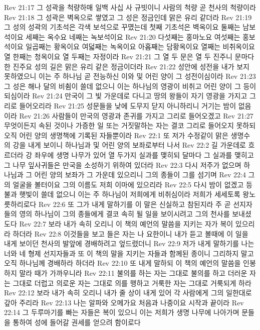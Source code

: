 Rev 21:17  그 성곽을 척량하매 일백 사십 사 규빗이니 사람의 척량 곧 천사의 척량이라
Rev 21:18  그 성곽은 벽옥으로 쌓였고 그 성은 정금인데 맑은 유리 같더라
Rev 21:19  그 성의 성곽의 기초석은 각색 보석으로 꾸몄는데 첫째 기초석은 벽옥이요 둘째는 남보석이요 세째는 옥수요 네째는 녹보석이요
Rev 21:20  다섯째는 홍마노요 여섯째는 홍보석이요 일곱째는 황옥이요 여덟째는 녹옥이요 아홉째는 담황옥이요 열째는 비취옥이요 열 한째는 청옥이요 열 두째는 자정이라
Rev 21:21  그 열 두 문은 열 두 진주니 문마다 한 진주요 성의 길은 맑은 유리 같은 정금이더라
Rev 21:22  성안에 성전을 내가 보지 못하였으니 이는 주 하나님 곧 전능하신 이와 및 어린 양이 그 성전이심이라
Rev 21:23  그 성은 해나 달의 비췸이 쓸데 없으니 이는 하나님의 영광이 비취고 어린 양이 그 등이 되심이라
Rev 21:24  만국이 그 빛 가운데로 다니고 땅의 왕들이 자기 영광을 가지고 그리로 들어오리라
Rev 21:25  성문들을 낮에 도무지 닫지 아니하리니 거기는 밤이 없음이라
Rev 21:26  사람들이 만국의 영광과 존귀를 가지고 그리로 들어오겠고
Rev 21:27  무엇이든지 속된 것이나 가증한 일 또는 거짓말하는 자는 결코 그리로 들어오지 못하되 오직 어린 양의 생명책에 기록된 자들뿐이라
Rev 22:1  또 저가 수정같이 맑은 생명수의 강을 내게 보이니 하나님과 및 어린 양의 보좌로부터 나서
Rev 22:2  길 가운데로 흐르더라 강 좌우에 생명 나무가 있어 열 두가지 실과를 맺히되 달마다 그 실과를 맺히고 그 나무 잎사귀들은 만국을 소성하기 위하여 있더라
Rev 22:3  다시 저주가 없으며 하나님과 그 어린 양의 보좌가 그 가운데 있으리니 그의 종들이 그를 섬기며
Rev 22:4  그의 얼굴을 볼터이요 그의 이름도 저희 이마에 있으리라
Rev 22:5  다시 밤이 없겠고 등불과 햇빛이 쓸데 없으니 이는 주 하나님이 저희에게 비취심이라 저희가 세세토록 왕노릇하리로다
Rev 22:6  또 그가 내게 말하기를 이 말은 신실하고 참된지라 주 곧 선지자들의 영의 하나님이 그의 종들에게 결코 속히 될 일을 보이시려고 그의 천사를 보내셨도다
Rev 22:7  보라 내가 속히 오리니 이 책의 예언의 말씀을 지키는 자가 복이 있으리라 하더라
Rev 22:8  이것들을 보고 들은 자는 나 요한이니 내가 듣고 볼때에 이 일을 내게 보이던 천사의 발앞에 경배하려고 엎드렸더니
Rev 22:9  저가 내게 말하기를 나는 너와 네 형제 선지자들과 또 이 책의 말을 지키는 자들과 함께된 종이니 그리하지 말고 오직 하나님께 경배하라 하더라
Rev 22:10  또 내게 말하되 이 책의 예언의 말씀을 인봉하지 말라 때가 가까우니라
Rev 22:11  불의를 하는 자는 그대로 불의를 하고 더러운 자는 그대로 더럽고 의로운 자는 그대로 의를 행하고 거룩한 자는 그대로 거룩되게 하라
Rev 22:12  보라 내가 속히 오리니 내가 줄 상이 내게 있어 각 사람에게 그의 일한대로 갚아 주리라
Rev 22:13  나는 알파와 오메가요 처음과 나중이요 시작과 끝이라
Rev 22:14  그 두루마기를 빠는 자들은 복이 있으니 이는 저희가 생명 나무에 나아가며 문들을 통하여 성에 들어갈 권세를 얻으려 함이로다
